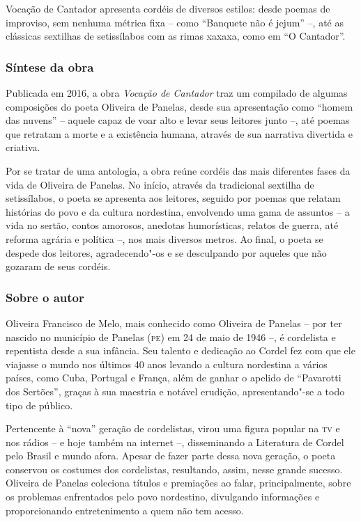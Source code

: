 \documentclass[12pt]{extarticle}
\begin{document}
{Vocação de Cantador apresenta cordéis de diversos estilos: desde poemas
de improviso, sem nenhuma métrica fixa -- como ``Banquete não é jejum''
--, até as clássicas sextilhas de setissílabos com as rimas xaxaxa, como
em ``O Cantador''.

\subsubsection{Síntese da obra}

Publicada em 2016, a obra \emph{Vocação de Cantador} traz um compilado
de algumas composições do poeta Oliveira de Panelas, desde sua
apresentação como ``homem das nuvens'' -- aquele capaz de voar alto e
levar seus leitores junto --, até poemas que retratam a morte e a
existência humana, através de sua narrativa divertida e criativa.

Por se tratar de uma antologia, a obra reúne cordéis das mais diferentes
fases da vida de Oliveira de Panelas. No início, através da tradicional
sextilha de setissílabos, o poeta se apresenta aos leitores, seguido por
poemas que relatam histórias do povo e da cultura nordestina, envolvendo
uma gama de assuntos -- a vida no sertão, contos amorosos, anedotas
humorísticas, relatos de guerra, até reforma agrária e política --, nos
mais diversos metros. Ao final, o poeta se despede dos leitores,
agradecendo"-os e se desculpando por aqueles que não gozaram de seus
cordéis.

\subsubsection{Sobre o autor}

Oliveira Francisco de Melo, mais conhecido como Oliveira de Panelas --
por ter nascido no município de Panelas (\textsc{pe}) em 24 de maio de 1946 --, é
cordelista e repentista desde a sua infância. Seu talento e dedicação ao
Cordel fez com que ele viajasse o mundo nos últimos 40 anos levando a
cultura nordestina a vários países, como Cuba, Portugal e França, além
de ganhar o apelido de ``Pavarotti dos Sertões'', graças à sua maestria
e notável erudição, apresentando"-se a todo tipo de público.

Pertencente à ``nova'' geração de cordelistas, virou uma figura popular
na \textsc{tv} e nos rádios -- e hoje também na internet --, disseminando a
Literatura de Cordel pelo Brasil e mundo afora. Apesar de fazer parte
dessa nova geração, o poeta conservou os costumes dos cordelistas,
resultando, assim, nesse grande sucesso. Oliveira de Panelas coleciona
títulos e premiações ao falar, principalmente, sobre os problemas
enfrentados pelo povo nordestino, divulgando informações e
proporcionando entretenimento a quem não tem acesso.

}
\end{document}
